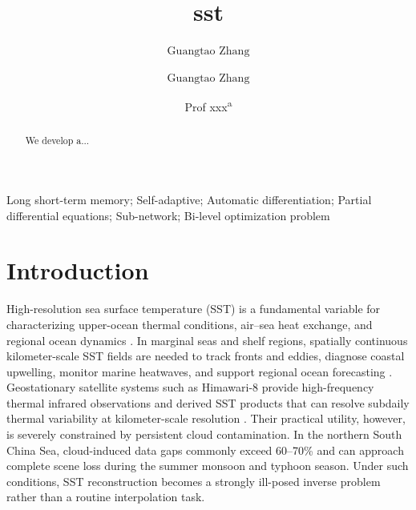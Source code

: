 \documentclass[12pt,reqno]{amsart}
\begin{document}
\begin{frontmatter}

\title{sst}

\author[a,b]{$\text{Guangtao Zhang}$}
\author[b,c]{$\text{Guangtao Zhang}$}
\author{Prof xxx\textsuperscript{a}}
\address[a]{Department of xxx, Faculty of Science and  Technology, University of Macau, Macau, China}
\address[b]{Department of xxx, College of xxx, xxx University, Guangdong, China}
\address[c]{Department of xxx, College of xxx, xxx University, Guangdong, China}

\begin{abstract}
We develop a...
\end{abstract}
\vspace{1cm}
\begin{keyword}
Long short-term memory;  Self-adaptive; Automatic differentiation; Partial differential equations; Sub-network; Bi-level optimization problem
\end{keyword}
\end{frontmatter}






\section{Introduction}

High-resolution sea surface temperature (SST) is a fundamental variable for characterizing upper-ocean thermal conditions, air--sea heat exchange, and regional ocean dynamics \cite{ocarroll_2019,deser_2010}. In marginal seas and shelf regions, spatially continuous kilometer-scale SST fields are needed to track fronts and eddies, diagnose coastal upwelling, monitor marine heatwaves, and support regional ocean forecasting \cite{ocarroll_2019,hobday_2016}. Geostationary satellite systems such as Himawari-8 provide high-frequency thermal infrared observations and derived SST products that can resolve subdaily thermal variability at kilometer-scale resolution \cite{bessho2016himawari,kurihara_2016}. Their practical utility, however, is severely constrained by persistent cloud contamination. In the northern South China Sea, cloud-induced data gaps commonly exceed 60--70\% and can approach complete scene loss during the summer monsoon and typhoon season. Under such conditions, SST reconstruction becomes a strongly ill-posed inverse problem rather than a routine interpolation task.
\end{document}
